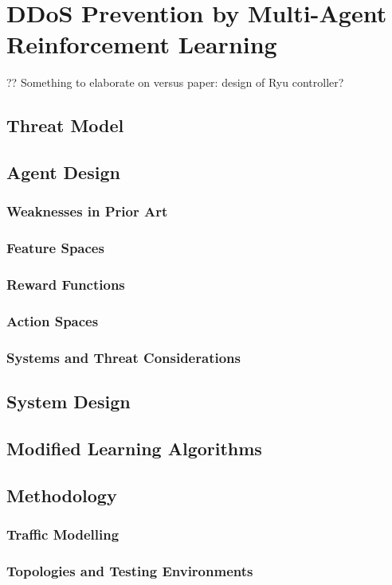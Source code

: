 \documentclass[twoside,hidelinks]{glasgowthesis}
\begin{document}
\chapter{DDoS Prevention by Multi-Agent Reinforcement Learning}\label{chap:ddos-rl}
?? Something to elaborate on versus paper: design of Ryu controller?

\section{Threat Model}
\section{Agent Design}
\subsection{Weaknesses in Prior Art}
\subsection{Feature Spaces}
\subsection{Reward Functions}
\subsection{Action Spaces}
\subsection{Systems and Threat Considerations}
\section{System Design}
\section{Modified Learning Algorithms}
\section{Methodology}
\subsection{Traffic Modelling}
\subsection{Topologies and Testing Environments}
\end{document}
